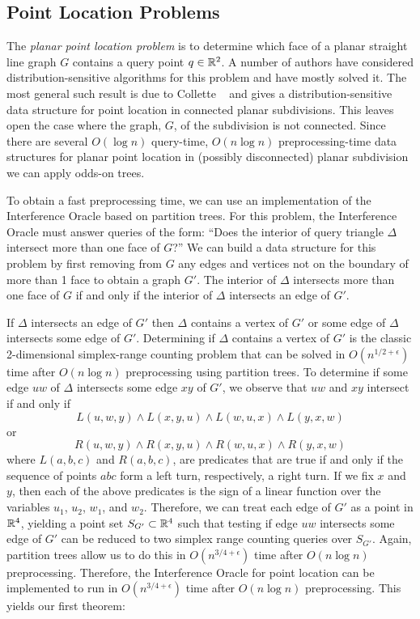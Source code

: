 \documentclass{patmorin}
\begin{document}
\subsection{Point Location Problems}

The \emph{planar point location problem} is to determine which face
of a planar straight line graph $G$ contains a query point $q\in\mathbb{R}^2$.
A number of authors have considered distribution-sensitive algorithms for
this problem \cite{acmr00,amm00,amm01a,amm01b,ammw07,cdilm08,i01,i04}
and have mostly solved it.  The most general such result is due to
Collette \etal\ \cite{cdilm08} and gives a distribution-sensitive
data structure for point location in connected planar subdivisions.
This leaves open the case where the graph, $G$, of the subdivision is not
connected.  Since there are several $O(\log n)$ query-time, $O(n\log n)$
preprocessing-time data structures for planar point location in (possibly
disconnected) planar subdivision \cite{as98,egs86,k83,m90,st86} we can
apply odds-on trees.

To obtain a fast preprocessing time, we can use an
implementation of the Interference Oracle based on partition trees.  For
this problem, the Interference Oracle must answer queries of the form:
``Does the interior of query triangle $\Delta$ intersect more than one face
of $G$?''  We can build a data structure for this problem by first removing
from $G$ any edges and vertices not on the boundary of more than 1 face to
obtain a graph $G'$.  The interior of $\Delta$ intersects more than one
face of $G$ if and only if the interior of $\Delta$ intersects an edge of
$G'$.

If $\Delta$ intersects an edge of $G'$ then $\Delta$ contains a vertex of
$G'$ or some edge of $\Delta$ intersects some edge of $G'$.  Determining if
$\Delta$ contains a vertex of $G'$ is the classic 2-dimensional
simplex-range counting problem that can be solved in $O(n^{1/2+\epsilon})$
time after $O(n\log n)$ preprocessing using partition trees.  To determine
if some edge $uw$ of $\Delta$ intersects some edge $xy$ of $G'$, we observe
that $uw$ and $xy$ intersect if and only if
\[ L(u,w,y) \wedge L(x,y,u) \wedge L(w,u,x) \wedge L(y,x,w) \]
or
\[ R(u,w,y) \wedge R(x,y,u) \wedge R(w,u,x) \wedge R(y,x,w) \]
where $L(a,b,c)$ and $R(a,b,c)$, are predicates that are true if and
only if the sequence of points $abc$ form a left turn, respectively, a
right turn.  If we fix $x$ and $y$, then each of the above predicates is
the sign of a linear function over the variables $u_1$, $u_2$, $w_1$,
and $w_2$.  Therefore, we can treat each edge of $G'$ as a point in
$\mathbb{R}^4$, yielding a point set $S_{G'} \subset\mathbb{R}^4$ such that testing if
edge $uw$ intersects some edge of $G'$ can be reduced to two simplex
range counting queries over $S_{G'}$.  Again, partition trees allow us to
do this in $O(n^{3/4+\epsilon})$ time after $O(n\log n)$ preprocessing.
Therefore, the Interference Oracle for point location can be implemented
to run in $O(n^{3/4+\epsilon})$ time after $O(n\log n)$ preprocessing.
This yields our first theorem:
\end{document}
